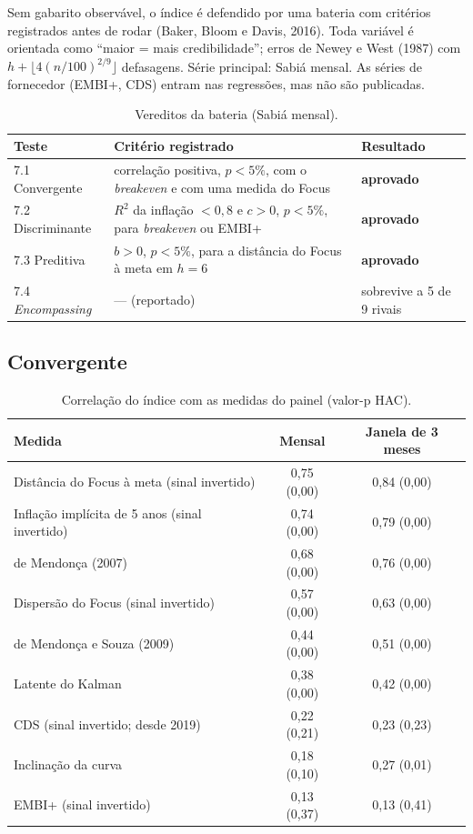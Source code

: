 \documentclass[11pt,a4paper]{article}
\begin{document}
Sem gabarito observável, o índice é defendido por uma bateria com critérios
registrados antes de rodar (Baker, Bloom e Davis, 2016). Toda variável é
orientada como ``maior = mais credibilidade''; erros de Newey e West (1987) com
$h+\lfloor 4(n/100)^{2/9}\rfloor$ defasagens. Série principal: Sabiá mensal.
As séries de fornecedor (EMBI+, CDS) entram nas regressões, mas não são
publicadas.

\begin{table}[H]
\centering\small
\caption{Vereditos da bateria (Sabiá mensal).}\label{tab:vereditos}
\begin{tabularx}{\textwidth}{@{}l X l@{}}
\toprule
Teste & Critério registrado & Resultado \\
\midrule
7.1 Convergente & correlação positiva, $p<5\%$, com o \emph{breakeven} e com uma medida do Focus & \textbf{aprovado} \\
7.2 Discriminante & $R^2$ da inflação $<0{,}8$ e $c>0$, $p<5\%$, para \emph{breakeven} ou EMBI+ & \textbf{aprovado} \\
7.3 Preditiva & $b>0$, $p<5\%$, para a distância do Focus à meta em $h=6$ & \textbf{aprovado} \\
7.4 \emph{Encompassing} & --- (reportado) & sobrevive a 5 de 9 rivais \\
\bottomrule
\end{tabularx}
\end{table}

\subsection{Convergente}

\begin{table}[H]
\centering\small
\caption{Correlação do índice com as medidas do painel (valor-p HAC).}\label{tab:conv}
\begin{tabular}{@{}lcc@{}}
\toprule
Medida & Mensal & Janela de 3 meses \\
\midrule
Distância do Focus à meta (sinal invertido) & 0,75 (0,00) & 0,84 (0,00) \\
Inflação implícita de 5 anos (sinal invertido) & 0,74 (0,00) & 0,79 (0,00) \\
de Mendonça (2007) & 0,68 (0,00) & 0,76 (0,00) \\
Dispersão do Focus (sinal invertido) & 0,57 (0,00) & 0,63 (0,00) \\
de Mendonça e Souza (2009) & 0,44 (0,00) & 0,51 (0,00) \\
Latente do Kalman & 0,38 (0,00) & 0,42 (0,00) \\
CDS (sinal invertido; desde 2019) & 0,22 (0,21) & 0,23 (0,23) \\
Inclinação da curva & 0,18 (0,10) & 0,27 (0,01) \\
EMBI+ (sinal invertido) & 0,13 (0,37) & 0,13 (0,41) \\
\bottomrule
\end{tabular}
\end{table}
\end{document}
